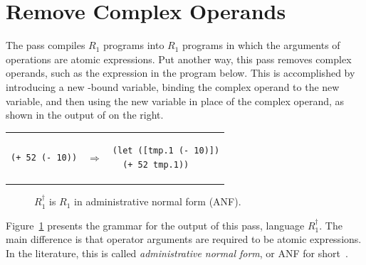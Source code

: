 \documentclass[11pt]{book}
\begin{document}
\section{Remove Complex Operands}
\label{sec:remove-complex-opera-R1}

The  pass compiles $R_1$ programs into
$R_1$ programs in which the arguments of operations are atomic
expressions.  Put another way, this pass removes complex
operands, such as the expression 
in the program below. This is accomplished by introducing a new
-bound variable, binding the complex operand to the new
variable, and then using the new variable in place of the complex
operand, as shown in the output of  on the
right.\\
\begin{tabular}{lll}
\begin{minipage}{0.4\textwidth}
\begin{lstlisting}
(+ 52 (- 10))
\end{lstlisting}
\end{minipage}
&
$\Rightarrow$
&
\begin{minipage}{0.4\textwidth}
\begin{lstlisting}
(let ([tmp.1 (- 10)])
  (+ 52 tmp.1))
\end{lstlisting}
\end{minipage}
\end{tabular}


\begin{figure}[tp]
\centering
{}
\caption{$R_1^{\dagger}$ is $R_1$ in administrative normal form (ANF).}
\label{fig:r1-anf-syntax}
\end{figure}

Figure~\ref{fig:r1-anf-syntax} presents the grammar for the output of
this pass, language $R_1^{\dagger}$. The main difference is that
operator arguments are required to be atomic expressions.  In the
literature, this is called \emph{administrative normal form}, or ANF
for short~\citep{Danvy:1991fk,Flanagan:1993cg}.
\end{document}
